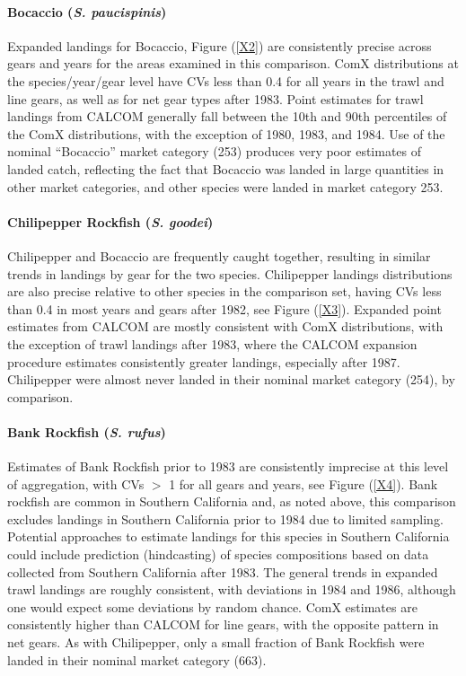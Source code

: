 \documentclass[12pt]{article}
\begin{document}
\paragraph{Bocaccio (\textit{S. paucispinis})}

Expanded landings for Bocaccio, Figure (\ref{X2}) are consistently precise 
across gears and years for the areas examined in this comparison. ComX 
distributions at the species/year/gear level have CVs less than 0.4 for all 
years in the trawl and line gears, as well as for net gear types after 1983. 
Point estimates for trawl landings from CALCOM generally fall between the 10th 
and 90th percentiles of the ComX distributions, with the exception of 1980, 
1983, and 1984. Use of the nominal ``Bocaccio'' market category (253) produces 
very poor estimates of landed catch, reflecting the fact that Bocaccio was 
landed in large quantities in other market categories, and other species were 
landed in market category 253.

\paragraph{Chilipepper Rockfish (\textit{S. goodei})}

Chilipepper and Bocaccio are frequently caught together, resulting in similar 
trends in landings by gear for the two species. Chilipepper landings 
distributions are also precise relative to other species in the comparison 
set, having CVs less than 0.4 in most years and gears after 1982, see 
Figure (\ref{X3}). Expanded point estimates from CALCOM are mostly consistent 
with ComX distributions, with the exception of trawl landings after 1983, 
where the CALCOM expansion procedure estimates consistently greater landings, 
especially after 1987. Chilipepper were almost never landed in their nominal 
market category (254), by comparison.

\paragraph{Bank Rockfish (\textit{S. rufus})}

Estimates of Bank Rockfish prior to 1983 are consistently imprecise at this 
level of aggregation, with CVs $>$ 1 for all gears and years, see 
Figure (\ref{X4}). Bank rockfish are common in Southern California and, as 
noted above, this comparison excludes landings in Southern California prior to 
1984 due to limited sampling. Potential approaches to estimate landings for 
this species in Southern California could include prediction (hindcasting) of 
species compositions based on data collected from Southern California after 
1983. The general trends in expanded trawl landings are roughly consistent, 
with deviations in 1984 and 1986, although one would expect some deviations 
by random chance. ComX estimates are consistently higher than CALCOM for 
line gears, with the opposite pattern in net gears. As with Chilipepper, only 
a small fraction of Bank Rockfish were landed in their nominal market 
category (663).
\end{document}
